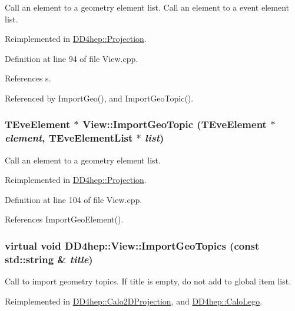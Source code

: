 Call an element to a geometry element list. Call an element to a event element list. 

Reimplemented in \hyperlink{class_d_d4hep_1_1_projection_a05c32084a42c00a366077acec5a55a82}{DD4hep::Projection}.

Definition at line 94 of file View.cpp.

References s.

Referenced by ImportGeo(), and ImportGeoTopic().\hypertarget{class_d_d4hep_1_1_view_a413a1148e0fb6d3007c971e9f1266629}{
\subsubsection[{ImportGeoTopic}]{\setlength{\rightskip}{0pt plus 5cm}TEveElement $\ast$ View::ImportGeoTopic (TEveElement $\ast$ {\em element}, \/  {\bf TEveElementList} $\ast$ {\em list})}}
\label{class_d_d4hep_1_1_view_a413a1148e0fb6d3007c971e9f1266629}


Call an element to a geometry element list. 

Reimplemented in \hyperlink{class_d_d4hep_1_1_projection_a97415addc63b3253bbccc3bcd0414c26}{DD4hep::Projection}.

Definition at line 104 of file View.cpp.

References ImportGeoElement().\hypertarget{class_d_d4hep_1_1_view_a2e3e96341bb654afd42e0ae144cecafb}{
\subsubsection[{ImportGeoTopics}]{\setlength{\rightskip}{0pt plus 5cm}virtual void DD4hep::View::ImportGeoTopics (const std::string \& {\em title})}}
\label{class_d_d4hep_1_1_view_a2e3e96341bb654afd42e0ae144cecafb}


Call to import geometry topics. If title is empty, do not add to global item list. 

Reimplemented in \hyperlink{class_d_d4hep_1_1_calo2_d_projection_ae4b76bf31fd029d99cece5e9f2df8937}{DD4hep::Calo2DProjection}, and \hyperlink{class_d_d4hep_1_1_calo_lego_ac70c1949f20282374d052be75356ad2e}{DD4hep::CaloLego}.

